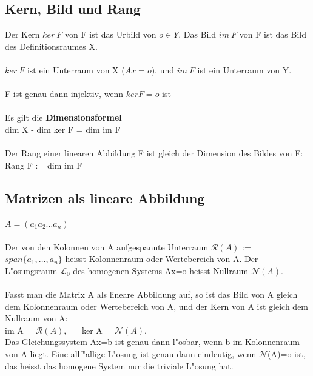 \documentclass[10pt, a4paper, twocolumn]{scrartcl}
\begin{document}
\subsection{Kern, Bild und Rang}

Der Kern $ker\:F$ von F ist das Urbild von $o \in Y$. Das Bild $im\:F$ von F ist das Bild des Definitionsraumes X.\\\\

$ker\:F$ ist ein Unterraum von X ($Ax={o}$), und $im\:F$ ist ein Unterraum von Y.\\\\

F ist genau dann injektiv, wenn $ker F = {o}$ ist\\\\

Es gilt die {\bf Dimensionsformel}\\
dim X - dim ker F = dim im F\\\\

Der Rang einer linearen Abbildung F ist gleich der Dimension des Bildes von F:\\
Rang F := dim im F\\

\subsection{Matrizen als lineare Abbildung}

$A=(a_1 a_2 \ldots a_n)$\\\\

Der von den Kolonnen von A aufgespannte Unterraum $\mathcal{R}(A)$ := $span\{a_1,\ldots,a_n\}$ heisst Kolonnenraum oder Wertebereich von A. Der L"osungsraum $\mathcal{L}_0$ des homogenen Systems Ax=o heisst Nullraum $\mathcal{N}(A)$.\\\\

Fasst man die Matrix A als lineare Abbildung auf, so ist das Bild von A gleich dem Kolonnenraum oder Wertebereich von A, und der Kern von A ist gleich dem Nullraum von A:\\ im A = $\mathcal{R}(A)$, \ \ \ ker A = $\mathcal{N}(A)$.\\

Das Gleichungssystem Ax=b ist genau dann l"osbar, wenn b im Kolonnenraum von A liegt. Eine allf"allige L"osung ist genau dann eindeutig, wenn $\mathcal{N}$(A)={o} ist, das heisst das homogene System nur die triviale L"osung hat.\\\\
\end{document}
